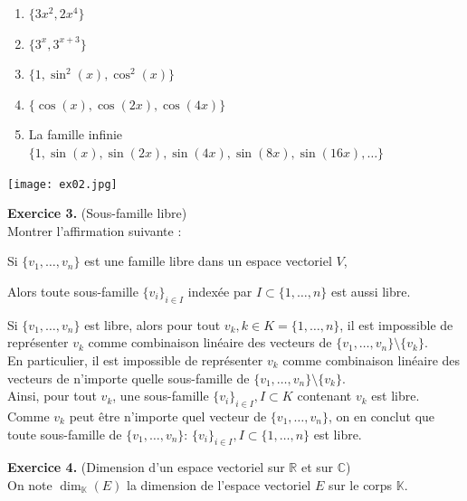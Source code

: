 \documentclass[a4paper, 10pt]{report}
\begin{document}
	\begin{enumerate}[label=\arabic*.]
		\item $\{3x^2, 2x^4\}$
		\item $\{3^x, 3^{x+3}\}$
		\item $\{1, \sin^2(x), \cos^2(x)\}$
		\item $\{\cos(x), \cos(2x), \cos(4x)\}$
		\item La famille infinie $\{1, \sin(x), \sin(2x), \sin(4x),
			\sin(8x), \sin(16x), \dotsc\}$
	\end{enumerate}
	
	\texttt{[image: ex02.jpg]}
	
	\newpage
	
	\noindent
	\textbf{Exercice 3.} (Sous-famille libre)\\
	Montrer l'affirmation suivante :
	
	Si $\{v_1, \dotsc, v_n\}$ est une famille libre dans un espace
	vectoriel $V$,
	
	Alors toute sous-famille $\{v_i\}_{i \in I}$ indexée par 
	$I \subset \{1, \dotsc, n\}$ est aussi libre.\\
	
	\colorbox{solution}
	{
		\begin{minipage}{0.9\textwidth}
			Si $\{v_1, \dotsc, v_n\}$ est libre, alors pour tout
			$v_k, k \in K = \{1, \dotsc, n\}$, il est impossible de
			représenter $v_k$ comme combinaison linéaire des vecteurs
			de $\{v_1, \dotsc, v_n\} \setminus \{v_k\}$.\\
			
			En particulier, il est impossible de représenter $v_k$
			comme combinaison linéaire des vecteurs de n'importe quelle
			sous-famille de $\{v_1, \dotsc, v_n\} \setminus \{v_k\}$.\\
			
			Ainsi, pour tout $v_k$, une sous-famille $\{v_i\}_{i \in I},
			I \subset K$ contenant $v_k$ est libre. Comme $v_k$ peut
			être n'importe quel vecteur de $\{v_1, \dotsc, v_n\}$, on
			en conclut que toute sous-famille de $\{v_1, \dotsc, v_n\}$:
			$\{v_i\}_{i \in I}, I \subset \{1, \dotsc, n\}$ est libre.
		\end{minipage}
	}
	
	\vspace{5mm}
	\noindent
	\textbf{Exercice 4.} (Dimension d'un espace vectoriel sur
	$\mathbb{R}$ et sur $\mathbb{C}$)\\
	On note $\dim_{\mathbb{K}}(E)$ la dimension de l'espace vectoriel
	$E$ sur le corps $\mathbb{K}$.
	
\end{document}

